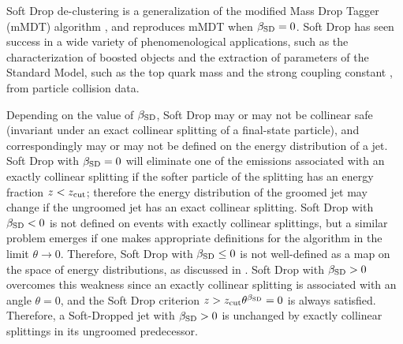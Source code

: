 Soft Drop de-clustering is a generalization of the modified Mass Drop Tagger (mMDT) algorithm \cite{Dasgupta:2013ihk}, and reproduces mMDT when \(\beta_{\rm SD} = 0\).
%
Soft Drop has seen success in a wide variety of phenomenological applications, such as the characterization of boosted objects \cite{Thaler:2008ju,Thaler:2011gf,Hook:2011cq,Gallicchio:2011xq,Soper:2012pb,Gallicchio:2012ez,CMS-PAS-JME-09-001,CMS-PAS-EXO-09-002,CMS:2013kfa,ATL-PHYS-PUB-2009-081,ATL-PHYS-PUB-2010-008,ATLAS:2019kwg,Cui:2010km,ATLAS-CONF-2011-053,Chatrchyan:2013rla,Larkoski:2013eya,Dasgupta:2012hg,Backovic:2013bga,ATLAS-CONF-2013-084,Komiske:2018vkc,Komiske:2016rsd,Metodiev:2018ftz,Krohn:2012fg,MERINO:2013tta,Bhattacherjee:2016bpy,Macaluso:2018tck,Egan:2017ojy,Kasieczka:2017nvn,Pearkes:2017hku,Butter:2017cot,Catani:1992ua,Dokshitzer:1998kz,Dasgupta:2001sh,Banfi:2004yd,Banfi:2005gj,Ellis:2009su,Banfi:2010pa,Walsh:2011fz,Chien:2012ur,Li:2012bw,Jouttenus:2013hs,Hatta:2013iba,Larkoski:2014tva,Procura:2018zpn,Aaboud:2017aca,Frye:2016aiz, Almeida:2008yp,Larkoski:2017iuy,Larkoski:2017cqq,Thaler:2010tr,Ellis:2009me,Abdesselam:2010pt,Katz:2010mr,Gallicchio:2010dq,Adams:2015hiv,Sirunyan:2017ezt,Moore:2018lsr,FerreiradeLima:2016gcz,Rubin:2010fc,Chatrchyan:2012sn,CMS-PAS-BTV-13-001,CMS-PAS-JME-13-006,Kribs:2009yh,Chen:2010wk,Hackstein:2010wk,Kim:2010uj,Almeida:2011aa,Pandolfi:2012ima,Vernieri:2014wfa,CMS-PAS-HIG-17-007,Procura:2014cba} and the extraction of parameters of the Standard Model, such as the top quark mass \cite{Hoang:2017kmk,ATLAS:2021urs,Negrini:2022gec} and the strong coupling constant \cite{Marzani:2019evv}, from particle collision data.

Depending on the value of \(\beta_{\rm SD}\), Soft Drop may or may not be collinear safe (invariant under an exact collinear splitting of a final-state particle), and correspondingly may or may not be defined on the energy distribution of a jet.
%
Soft Drop with \(\beta_{\rm SD} = 0\) will eliminate one of the emissions associated with an exactly collinear splitting if the softer particle of the splitting has an energy fraction \(z < z_{\rm cut}\);
%
therefore the energy distribution of the groomed jet may change if the ungroomed jet has an exact collinear splitting.
%
Soft Drop with \(\beta_{\rm SD} < 0\) is not defined on events with exactly collinear splittings, but a similar problem emerges if one makes appropriate definitions for the algorithm in the limit \(\theta \to 0\).
%
Therefore, Soft Drop with \(\beta_{\rm SD} \leq 0\) is not well-defined as a map on the space of energy distributions, as discussed in .
%
Soft Drop with \(\beta_{\rm SD} > 0\) overcomes this weakness since an exactly collinear splitting is associated with an angle \(\theta = 0\), and the Soft Drop criterion \(z > z_{\rm cut} \theta^{\beta_{\rm SD}} = 0\) is always satisfied.
%
Therefore, a Soft-Dropped jet with \(\beta_{\rm SD} > 0\) is unchanged by exactly collinear splittings in its ungroomed predecessor.


